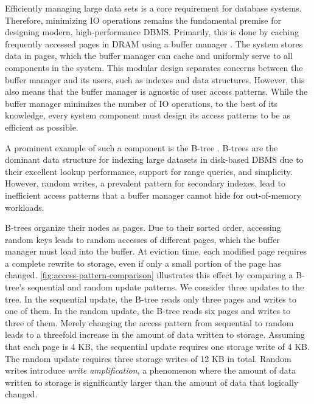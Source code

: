 Efficiently managing large data sets is a core requirement for database systems. 
Therefore, minimizing \ac{IO} operations remains the fundamental premise for designing modern, high-performance \ac{DBMS}.
Primarily, this is done by caching frequently accessed pages in \ac{DRAM} using a buffer manager \cite{leis2018leanstore}.
The system stores data in pages, which the buffer manager can cache and uniformly serve to all components in the system.
This modular design separates concerns between the buffer manager and its users, such as indexes and data structures.
However, this also means that the buffer manager is agnostic of user access patterns.
While the buffer manager minimizes the number of \ac{IO} operations, to the best of its knowledge, every system component must design its access patterns to be as efficient as possible. 

A prominent example of such a component is the B-tree \cite{bayer1970organization}.
B-trees are the dominant data structure for indexing large datasets in disk-based \ac{DBMS} due to their excellent lookup performance, support for range queries, and simplicity.
However, random writes, a prevalent pattern for secondary indexes, lead to inefficient access patterns that a buffer manager cannot hide for out-of-memory workloads.

B-trees organize their nodes as pages. 
Due to their sorted order, accessing random keys leads to random accesses of different pages, which the buffer manager must load into the buffer.
At eviction time, each modified page requires a complete rewrite to storage, even if only a small portion of the page has changed.
\autoref{fig:access-pattern-comparison} illustrates this effect by comparing a B-tree's sequential and random update patterns.
We consider three updates to the tree.
In the sequential update, the B-tree reads only three pages and writes to one of them.
In the random update, the B-tree reads six pages and writes to three of them.
Merely changing the access pattern from sequential to random leads to a threefold increase in the amount of data written to storage.
Assuming that each page is 4 KB, the sequential update requires one storage write of 4 KB.
The random update requires three storage writes of 12 KB in total.
Random writes introduce \emph{write amplification}, a phenomenon where the amount of data written to storage is significantly larger than the amount of data that logically changed.

